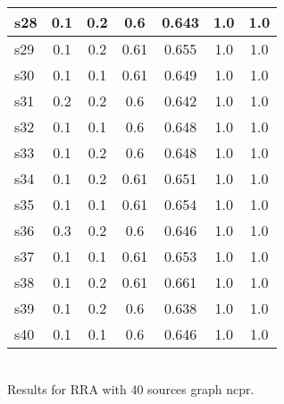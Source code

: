 \documentclass{article}
\begin{document}
\begin{tabular}{|l|c|c|c|c|c|c|}
\hline
s28 &0.1 & 0.2 & 0.6 & 0.643 & 1.0 & 1.0\\
\hline
s29 &0.1 & 0.2 & 0.61 & 0.655 & 1.0 & 1.0\\
\hline
s30 &0.1 & 0.1 & 0.61 & 0.649 & 1.0 & 1.0\\
\hline
s31 &0.2 & 0.2 & 0.6 & 0.642 & 1.0 & 1.0\\
\hline
s32 &0.1 & 0.1 & 0.6 & 0.648 & 1.0 & 1.0\\
\hline
s33 &0.1 & 0.2 & 0.6 & 0.648 & 1.0 & 1.0\\
\hline
s34 &0.1 & 0.2 & 0.61 & 0.651 & 1.0 & 1.0\\
\hline
s35 &0.1 & 0.1 & 0.61 & 0.654 & 1.0 & 1.0\\
\hline
s36 &0.3 & 0.2 & 0.6 & 0.646 & 1.0 & 1.0\\
\hline
s37 &0.1 & 0.1 & 0.61 & 0.653 & 1.0 & 1.0\\
\hline
s38 &0.1 & 0.2 & 0.61 & 0.661 & 1.0 & 1.0\\
\hline
s39 &0.1 & 0.2 & 0.6 & 0.638 & 1.0 & 1.0\\
\hline
s40 &0.1 & 0.1 & 0.6 & 0.646 & 1.0 & 1.0\\
\hline
\end{tabular}\\

\noindent Results for RRA with 40 sources graph ncpr.
\end{document}

